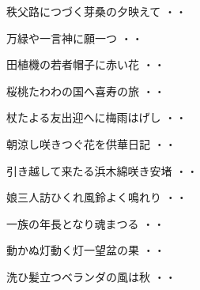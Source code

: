 \begin{shiika}秩父路につづく芽桑の夕映えて
\hfill{・・}\end{shiika}
\vspace{0.6cm}
\begin{shiika}万緑や一言神に願一つ
\hfill{・・}\end{shiika}
\vspace{0.6cm}
\begin{shiika}田植機の若者帽子に赤い花
\hfill{・・}\end{shiika}
\vspace{0.6cm}
\begin{shiika}桜桃たわわの国へ喜寿の旅
\hfill{・・}\end{shiika}
\vspace{0.6cm}
\begin{shiika}杖たよる友出迎へに梅雨はげし
\hfill{・・}\end{shiika}
\vspace{0.6cm}
\begin{shiika}朝涼し咲きつぐ花を供華日記
\hfill{・・}\end{shiika}
\vspace{0.6cm}
\begin{shiika}引き越して来たる浜木綿咲き安堵
\hfill{・・}\end{shiika}
\vspace{0.6cm}
\begin{shiika}娘三人訪ひくれ風鈴よく鳴れり
\hfill{・・}\end{shiika}
\vspace{0.6cm}
\begin{shiika}一族の年長となり魂まつる
\hfill{・・}\end{shiika}
\vspace{0.6cm}
\begin{shiika}動かぬ灯動く灯一望盆の果
\hfill{・・}\end{shiika}
\vspace{0.6cm}
\begin{shiika}洗ひ髪立つベランダの風は秋
\hfill{・・}\end{shiika}
\vspace{0.6cm}
